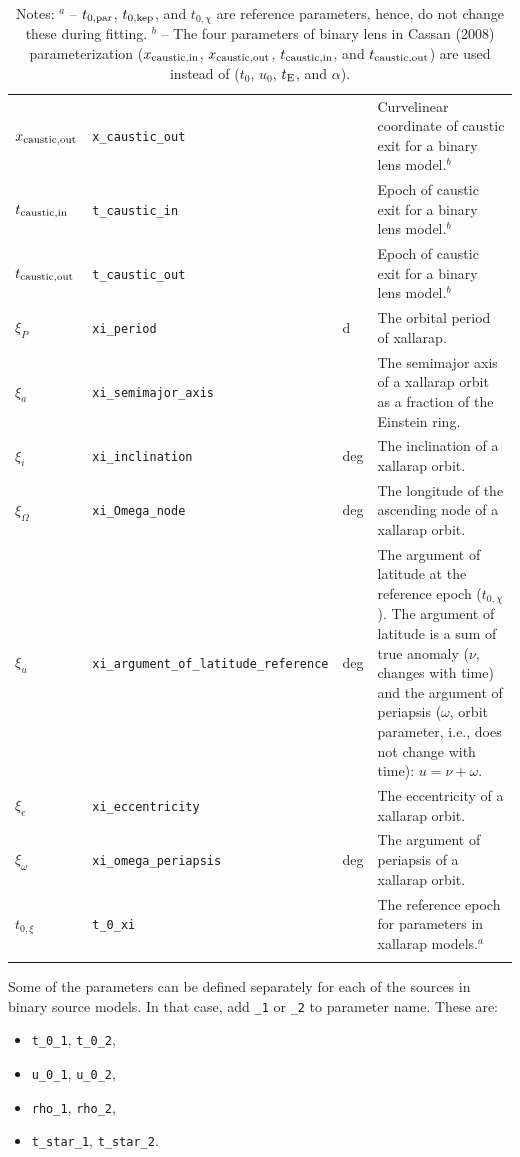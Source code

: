 \documentclass[12pt]{article}
\begin{document}
\begin{landscape}
\begin{longtable}{l l l p{12cm}}
$x_{\rm caustic, out}$ & {\tt x\_caustic\_out} & & Curvelinear coordinate of caustic exit for a binary lens model.$^b$ \\
$t_{\rm caustic, in}$ & {\tt t\_caustic\_in} & & Epoch of caustic exit for a binary lens model.$^b$ \\
$t_{\rm caustic, out}$ & {\tt t\_caustic\_out} & & Epoch of caustic exit for a binary lens model.$^b$ \\
$\xi_P$ & \texttt{xi\_period} & d & The orbital period of xallarap.\\
$\xi_a$ & \texttt{xi\_semimajor\_axis} & & The semimajor axis of a xallarap orbit as a fraction of the Einstein ring.\\
$\xi_i$ & \texttt{xi\_inclination} & deg & The inclination of a xallarap orbit.\\
$\xi_\Omega$ & \texttt{xi\_Omega\_node} & deg & The longitude of the ascending node of a xallarap orbit.\\
$\xi_u$ & \texttt{xi\_argument\_of\_latitude\_reference} & deg & The argument of latitude at the reference epoch ($t_{0,\chi}$). The argument of latitude is a sum of true anomaly ($\nu$, changes with time) and the argument of periapsis ($\omega$, orbit parameter, i.e., does not change with time): $u = \nu + \omega$.\\
$\xi_e$ & \texttt{xi\_eccentricity} & & The eccentricity of a xallarap orbit.\\
$\xi_\omega$ & \texttt{xi\_omega\_periapsis} & deg & The argument of periapsis of a xallarap orbit.\\
$t_{0,\xi}$ & \texttt{t\_0\_xi} & &  The reference epoch for parameters in xallarap models.$^a$\\
\hline
\caption{Notes: \newline
$^a$ -- $t_{0,{\rm par}}$, $t_{0,{\rm kep}}$, and $t_{0,\chi}$ are reference parameters, hence, do not change these during fitting. \newline
$^b$ -- The four parameters of binary lens in Cassan (2008) parameterization ($x_{\rm caustic, in}$, $x_{\rm caustic, out}$, $t_{\rm caustic, in}$, and $t_{\rm caustic, out}$) are used instead of ($t_0$, $u_0$, $t_{\rm E}$, and $\alpha$).
}
\end{longtable}
\end{landscape}

Some of the parameters can be defined separately for each of the sources in binary source models.  
In that case, add {\tt \_1} or {\tt \_2} to parameter name. These are:
\begin{itemize}
\item {\tt t\_0\_1}, {\tt t\_0\_2},
\item {\tt u\_0\_1}, {\tt u\_0\_2},
\item {\tt rho\_1}, {\tt rho\_2},
\item {\tt t\_star\_1}, {\tt t\_star\_2}.
\end{itemize}
\end{document}
